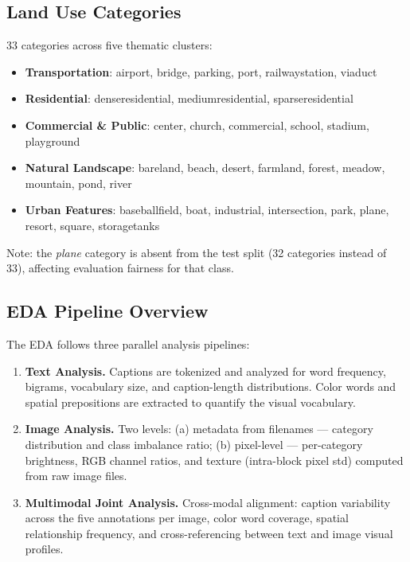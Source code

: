 \subsection{Land Use Categories}

33 categories across five thematic clusters:

\begin{itemize}
    \item \textbf{Transportation}: airport, bridge, parking, port, railwaystation, viaduct
    \item \textbf{Residential}: denseresidential, mediumresidential, sparseresidential
    \item \textbf{Commercial \& Public}: center, church, commercial, school, stadium, playground
    \item \textbf{Natural Landscape}: bareland, beach, desert, farmland, forest, meadow, mountain, pond, river
    \item \textbf{Urban Features}: baseballfield, boat, industrial, intersection, park, plane, resort, square, storagetanks
\end{itemize}

Note: the \textit{plane} category is absent from the test split (32 categories instead of 33), affecting evaluation fairness for that class.

\subsection{EDA Pipeline Overview}

The EDA follows three parallel analysis pipelines:

\begin{enumerate}
    \item \textbf{Text Analysis.} Captions are tokenized and analyzed for word frequency, bigrams, vocabulary size, and caption-length distributions. Color words and spatial prepositions are extracted to quantify the visual vocabulary.

    \item \textbf{Image Analysis.} Two levels: (a) metadata from filenames --- category distribution and class imbalance ratio; (b) pixel-level --- per-category brightness, RGB channel ratios, and texture (intra-block pixel std) computed from raw image files.

    \item \textbf{Multimodal Joint Analysis.} Cross-modal alignment: caption variability across the five annotations per image, color word coverage, spatial relationship frequency, and cross-referencing between text and image visual profiles.
\end{enumerate}

